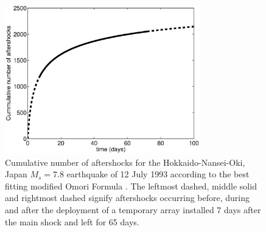 \documentclass[extra]{gji}
\begin{document}
\begin{figure}
\noindent\includegraphics[width = 20pc]{diags/OmoriFigure.eps}
\caption{Cumulative number of aftershocks for the Hokkaido-Nansei-Oki, Japan
$M_s=7.8$ earthquake of 12 July 1993 according to the best fitting modified Omori Formula
\citep{dr_Utsu95a}. The leftmost dashed, middle solid and rightmost dashed signify aftershocks occurring before, during and
after the deployment of a temporary array installed 7 days after the main shock and left for
65 days.}
\label{fig:Omorifigure}
\end{figure}


\end{document}
